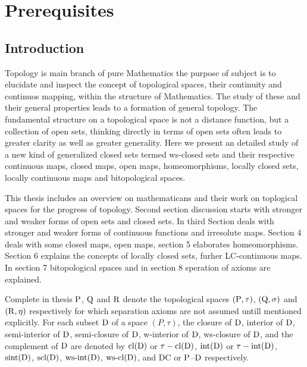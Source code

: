 \chapter{Prerequisites}
\graphicspath{{Chapter1/Chapter1Figs/EPS/}{Chapter1/Chapter1Figs/}}

\section{Introduction}

Topology is main branch of pure Mathematics the purpose of subject is to elucidate and inspect the concept of topological spaces, their continuity and continuos mapping, within the structure of Mathematics. The study of these and their general properties leads to a formation of general topology. The fundamental structure on a topological space is not a distance function, but a collection of open sets, thinking directly in terms of open sets often leads to greater clarity as well as greater generality. Here we present an detailed study of a new kind of generalized closed sets termed ws-closed sets and their respective continuous maps, closed maps, open maps, homeomorphisms, locally closed sets, locally continuous maps and bitopological spaces.

This thesis includes an overview on mathematicans and their work on toplogical spaces for the progress of topology. Second section discussion starts with stronger and weaker forms of open sets and closed sets. In third Section deals with stronger and weaker forms of continuous functions and irresolute maps. Section 4 deals with some closed maps, open maps, section 5 elaborates homeomorphisms. Section 6 explains the concepts of locally closed sets, furher LC-continuous maps. In section 7 bitopological spaces and in section 8 speration of axioms are explained.

Complete in thesis $\mathrm{P}$, $\mathrm{Q}$ and $\mathrm{R}$ denote the topological spaces $(\mathrm{P},\tau)$, $(\mathrm{Q},\sigma)$ and $(\mathrm{R}, \eta)$ respectively for which separation axioms are not assumed untill mentioned explicitly. For each subset $\mathrm{D}$ of a space $(P, \tau)$, the closure of $\mathrm{D}$, interior of $\mathrm{D}$, semi-interior of $\mathrm{D}$, semi-closure of $\mathrm{D}$, w-interior of $\mathrm{D}$, ws-closure of $\mathrm{D}$, and the complement of $\mathrm{D}$ are denoted by $\mbox{cl}(\mathrm{D})$ or $\tau-\mbox{cl}(\mathrm{D})$, $\mbox{int}(\mathrm{D})$ or $\tau-\mbox{int}(\mathrm{D})$, $\mbox{sint}(\mathrm{D})$, $\mbox{scl}(\mathrm{D})$, $\mbox{ws-int}(\mathrm{D})$, $\mbox{ws-cl}(\mathrm{D})$, and DC or $\mathrm{P}$--$\mathrm{D}$ respectively.

